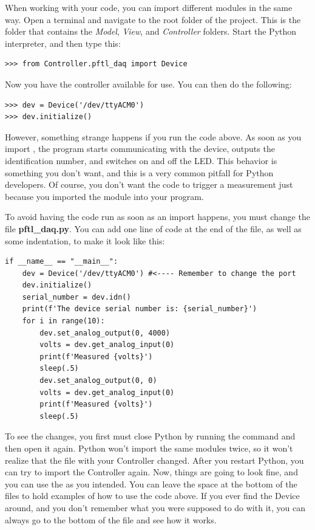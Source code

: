 When working with your code, you can import different modules in the same way. Open a terminal and navigate to the root folder of the project. This is the folder that contains the \emph{Model}, \emph{View}, and \emph{Controller} folders. Start the Python interpreter, and then type this:

\begin{verbatim}
>>> from Controller.pftl_daq import Device
\end{verbatim}

Now you have the controller available for use. You can then do the following:

\begin{verbatim}
>>> dev = Device('/dev/ttyACM0')
>>> dev.initialize()
\end{verbatim}

However, something strange happens if you run the code above. As soon as you import , the program starts communicating with the device, outputs the identification number, and switches on and off the LED. This behavior is something you don't want, and this is a very common pitfall for Python developers. Of course, you don't want the code to trigger a measurement just because you imported the module into your program.

To avoid having the code run as soon as an import happens, you must change the file \textbf{pftl\_daq.py}. You can add one line of code at the end of the file, as well as some indentation, to make it look like this:

\begin{verbatim}
if __name__ == "__main__":
    dev = Device('/dev/ttyACM0') #<---- Remember to change the port
    dev.initialize()
    serial_number = dev.idn()
    print(f'The device serial number is: {serial_number}')
    for i in range(10):
        dev.set_analog_output(0, 4000)
        volts = dev.get_analog_input(0)
        print(f'Measured {volts}')
        sleep(.5)
        dev.set_analog_output(0, 0)
        volts = dev.get_analog_input(0)
        print(f'Measured {volts}')
        sleep(.5)
\end{verbatim}

To see the changes, you first must close Python by running the  command and then open it again. Python won't import the same modules twice, so it won't realize that the file with your Controller changed. After you restart Python, you can try to import the Controller again. Now, things are going to look fine, and you can use the  as you intended. You can leave the space at the bottom of the files to hold examples of how to use the code above. If you ever find the Device around, and you don't remember what you were supposed to do with it, you can always go to the bottom of the file and see how it works.

